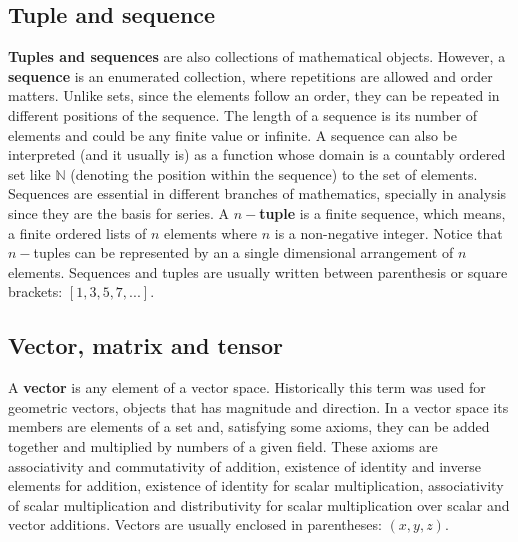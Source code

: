         \subsection*{Tuple and sequence}
        \vspace{-.5cm}
\textbf{Tuples and sequences} are also collections of mathematical objects.
However, a \textbf{sequence} is an enumerated collection, where repetitions are allowed and order matters.
Unlike sets, since the elements follow an order, they can be repeated in different positions of the sequence.
The length of a sequence is its number of elements and could be any finite value or infinite.
A sequence can also be interpreted (and it usually is) as a function whose domain is a countably ordered set like $\mathbb{N}$ 
(denoting the position within the sequence) to the set of elements. 
Sequences are essential in different branches of mathematics, specially in analysis since they are 
the basis for series.
A $n-$\textbf{tuple} is a finite sequence, which means, a finite ordered lists of $n$ elements where $n$ is a non-negative integer.
Notice that $n-$tuples can be represented by an a single dimensional arrangement of $n$ elements.
Sequences and tuples are usually written between parenthesis or square brackets: $[1,3,5,7,...]$.

        \vspace{-.5cm}
        \subsection*{Vector, matrix and tensor}
        \vspace{-.5cm}
A \textbf{vector} is any element of a vector space.
Historically this term was used for geometric vectors, objects that has magnitude and direction.
In a vector space its members are elements of a set and, satisfying some axioms, they can be added together and multiplied by numbers of a given field. 
These axioms are associativity and commutativity of addition, 
existence of identity and inverse elements for addition, 
existence of identity for scalar multiplication, 
associativity of scalar multiplication and 
distributivity for scalar multiplication over scalar and vector additions. 
Vectors are usually enclosed in parentheses: $(x,y,z)$.

